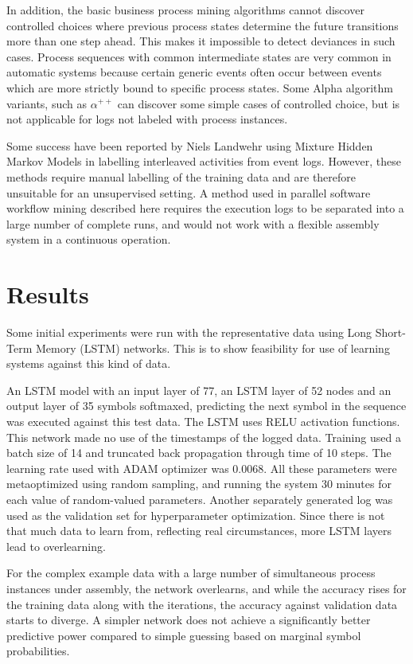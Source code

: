 \documentclass[journal]{IEEEtran}
\begin{document}
In addition, the basic business process mining algorithms cannot discover controlled choices where previous process states
determine the future transitions more than one step ahead. This makes it impossible to detect deviances in such cases. Process sequences with common intermediate states
are very common in automatic systems because certain generic events often occur between events which are more strictly bound to specific process states. Some Alpha algorithm
variants, such as $\alpha^{++}$ \cite{wen2007mining} can discover some simple cases of controlled choice, but is not applicable for logs not labeled with process instances.

Some success have been reported by Niels Landwehr using Mixture Hidden Markov Models \cite{landwehr2008modeling} in labelling interleaved activities from event logs.
However, these methods require manual labelling of the training data and are therefore unsuitable for an unsupervised setting.
A method used in parallel software workflow mining described here \cite{mining-program-workflow-from-interleaved-traces} requires the execution logs to be separated into
a large number of complete runs, and would not work with a flexible assembly system in a continuous operation.

\section{Results}

Some initial experiments were run with the representative data using Long Short-Term Memory (LSTM) networks. This is to show feasibility for use of learning systems
against this kind of data.

An LSTM model with an input layer of 77, an LSTM layer of 52 nodes and an output layer of 35 symbols softmaxed,
predicting the next symbol in the sequence was executed against this test data. The LSTM uses RELU activation functions. This network made no use of the timestamps
of the logged data.
Training used a batch size of 14 and truncated back propagation through time of 10 steps. The learning rate used with ADAM optimizer was 0.0068. All these parameters
were metaoptimized using random sampling, and running the system 30 minutes for each value of random-valued parameters. Another separately generated log was used
as the validation set for hyperparameter optimization. Since there is not that much data to learn from, reflecting real circumstances, more LSTM layers lead to overlearning.

For the complex example data with a large number of simultaneous process instances under assembly, the network overlearns, and while the accuracy rises for the training data along with the iterations,
the accuracy against validation data starts to diverge. A simpler network does not achieve a significantly better predictive power compared to simple guessing based on marginal symbol probabilities.
\end{document}
